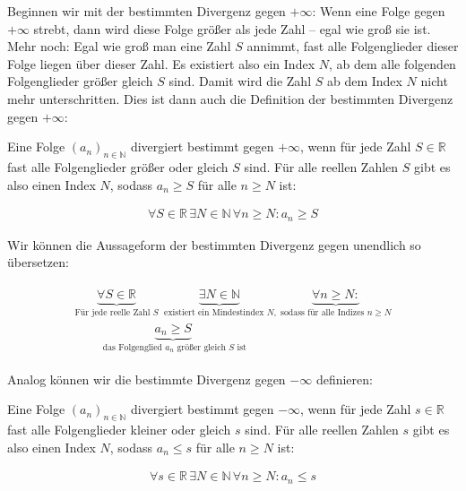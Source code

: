 \documentclass[fontsize=9pt,
               parskip=half-,
               DIV=14,
               listof=chapterentry,
               tocflat]{scrbook}
\begin{document}
Beginnen wir mit der bestimmten Divergenz gegen $+\infty $: Wenn eine Folge gegen $+\infty $ strebt, dann wird diese Folge größer als jede Zahl – egal wie groß sie ist. Mehr noch: Egal wie groß man eine Zahl $S$ annimmt, fast alle Folgenglieder dieser Folge liegen über dieser Zahl. Es existiert also ein Index $N$, ab dem alle folgenden Folgenglieder größer gleich $S$ sind. Damit wird die Zahl $S$ ab dem Index $N$ nicht mehr unterschritten. Dies ist dann auch die Definition der bestimmten Divergenz gegen $+\infty $:

\begin{definition*}
Eine Folge $(a_{n})_{n\in \mathbb {N} }$ divergiert bestimmt gegen $+\infty $, wenn für jede Zahl $S\in \mathbb {R} $ fast alle Folgenglieder größer oder gleich $S$ sind. Für alle reellen Zahlen $S$ gibt es also einen Index $N$, sodass $a_{n}\geq S$ für alle $n\geq N$ ist:

\begin{align*}
\forall S\in \mathbb {R} \,\exists N\in \mathbb {N} \,\forall n\geq N:a_{n}\geq S
\end{align*}

\end{definition*}

Wir können die Aussageform der bestimmten Divergenz gegen unendlich so übersetzen:

\begin{align*}
{\begin{array}{l}\underbrace {{\underset {}{}}\forall S\in \mathbb {R} } _{{\text{Für jede reelle Zahl }}S}\ \underbrace {{\underset {}{}}\exists N\in \mathbb {N} } _{{\text{ existiert ein Mindestindex }}N,}\ \underbrace {{\underset {}{}}\forall n\geq N:} _{{\text{sodass für alle Indizes }}n\geq N}\\[0.5em]\quad \quad \underbrace {{\underset {}{}}a_{n}\geq S} _{{\text{ das Folgenglied }}a_{n}{\text{ größer gleich }}S{\text{ ist}}}\end{array}}
\end{align*}

Analog können wir die bestimmte Divergenz gegen $-\infty $ definieren:

\begin{definition*}
Eine Folge $(a_{n})_{n\in \mathbb {N} }$ divergiert bestimmt gegen $-\infty $, wenn für jede Zahl $s\in \mathbb {R} $ fast alle Folgenglieder kleiner oder gleich $s$ sind. Für alle reellen Zahlen $s$ gibt es also einen Index $N$, sodass $a_{n}\leq s$ für alle $n\geq N$ ist:

\begin{align*}
\forall s\in \mathbb {R} \,\exists N\in \mathbb {N} \,\forall n\geq N:a_{n}\leq s
\end{align*}

\end{definition*}
\end{document}
